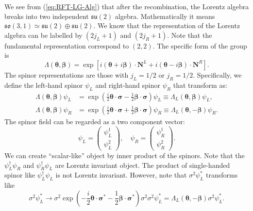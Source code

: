 \documentclass[aps,prb,superscriptaddress,nofootinbib]{revtex4}
\begin{document}
We see from (\ref{eq:RFT-LG-Alg}) that after the recombination, the Lorentz algebra breaks into two independent $\mathfrak{su}(2)$ algebra.
Mathematically it means $\mathfrak{so}(3,1) \simeq \mathfrak{su}(2) \oplus \mathfrak{su}(2)$.
We know that the representation of the Lorentz algebra can be labelled by $(2 j_L+1)$ and $(2 j_R+1)$.
Note that the fundamental representation correspond to $(2,2)$.
The specific form of the group is
\begin{equation}
	\Lambda(\bm\theta,\bm\beta)
	=\exp\left[i(\bm\theta+i\bm\beta)\cdot \bm N^L + i(\bm\theta-i\bm\beta)\cdot \bm N^R\right].
\end{equation}
The spinor representations are those with $j_L=1/2$ or $j_R=1/2$. 
Specifically, we define the left-hand spinor $\psi_L$ and right-hand spinor $\psi_R$ that transform as:
\begin{equation}\label{eq:qft-left-right-spinor-rep}
\begin{aligned}
	\Lambda(\bm\theta,\bm\beta)\psi_L 
	&= \exp\left(\frac{i}{2}\bm\theta\cdot\bm\sigma-\frac{1}{2}\bm\beta\cdot\bm\sigma \right) \psi_L \equiv \Lambda_L(\bm \theta, \bm \beta)\psi_L, \\
	\Lambda(\bm\theta,\bm\beta)\psi_R 
	&= \exp\left(\frac{i}{2}\bm\theta\cdot\bm\sigma+\frac{1}{2}\bm\beta\cdot\bm\sigma \right) \psi_R \equiv \Lambda_L(\bm \theta, -\bm \beta)\psi_R.
\end{aligned}
\end{equation}
The spinor field can be regarded as a two component vector:
\begin{equation}
	\psi_L = \begin{pmatrix}
		\psi_L^1 \\ \psi_L^2
	\end{pmatrix}, \quad
	\psi_R = \begin{pmatrix}
		\psi_R^1 \\ \psi_R^2
	\end{pmatrix}.
\end{equation}
We can create ``scalar-like'' object by inner product of the spinors.
Note that the $\psi_L^\dagger \psi_R$ and $\psi_R^\dagger \psi_L$ are Lorentz invariant object.
The product of single-handed spinor like $\psi_L^\dagger \psi_L$ is not Lorentz invariant.
However, note that $\sigma^2 \psi_L^*$ transforms like
\begin{equation}
	\sigma^2 \psi_L^*
	\rightarrow \sigma^2 \exp\left(-\frac{i}{2}\bm\theta\cdot\bm\sigma^*-\frac{1}{2}\bm\beta\cdot\bm\sigma^* \right) \sigma^2 \sigma^2 \psi_L^* 
	= \Lambda_L(\bm \theta, -\bm\beta) \sigma^2 \psi_L^*.
\end{equation}
\end{document}
